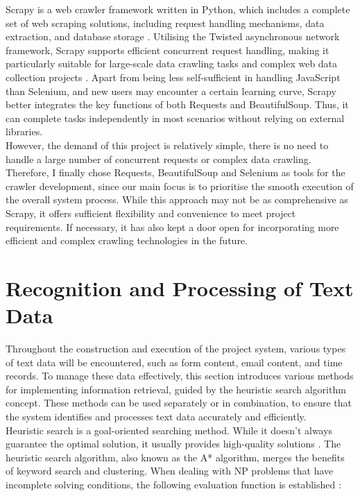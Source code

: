 \documentclass[ oneside,%
                    author={Cassie Qing Tang},
                    degree={BSc},
                     title={An Automated Response System for Disrupting Online Pet Scamming \\ },
                    subtitle={ }]{dissertation}
\begin{document}
Scrapy is a web crawler framework written in Python, which includes a complete set of web scraping solutions, including request handling mechanisms, data extraction, and database storage \cite{noauthor_intro_nodate}. Utilising the Twisted asynchronous network framework, Scrapy supports efficient concurrent request handling, making it particularly suitable for large-scale data crawling tasks and complex web data collection projects \cite{noauthor_intro_nodate}. Apart from being less self-sufficient in handling JavaScript than Selenium, and new users may encounter a certain learning curve, Scrapy better integrates the key functions of both Requests and BeautifulSoup. Thus, it can complete tasks independently in most scenarios without relying on external libraries.
\\

However, the demand of this project is relatively simple, there is no need to handle a large number of concurrent requests or complex data crawling. Therefore, I finally chose Requests, BeautifulSoup and Selenium as tools for the crawler development, since our main focus is to prioritise the smooth execution of the overall system process. While this approach may not be as comprehensive as Scrapy, it offers sufficient flexibility and convenience to meet project requirements. If necessary, it has also kept a door open for incorporating more efficient and complex crawling technologies in the future.


\section{Recognition and Processing of Text Data}
Throughout the construction and execution of the project system, various types of text data will be encountered, such as form content, email content, and time records. To manage these data effectively, this section introduces various methods for implementing information retrieval, guided by the heuristic search algorithm concept. These methods can be used separately or in combination, to ensure that the system identifies and processes text data accurately and efficiently.
\\

Heuristic search is a goal-oriented searching method. While it doesn't always guarantee the optimal solution, it usually provides high-quality solutions \cite{a_chapter_2001}. The heuristic search algorithm, also known as the A* algorithm, merges the benefits of keyword search and clustering. When dealing with NP problems that have incomplete solving conditions, the following evaluation function is established \cite{zhao_information_2014}:
\\
\end{document}
